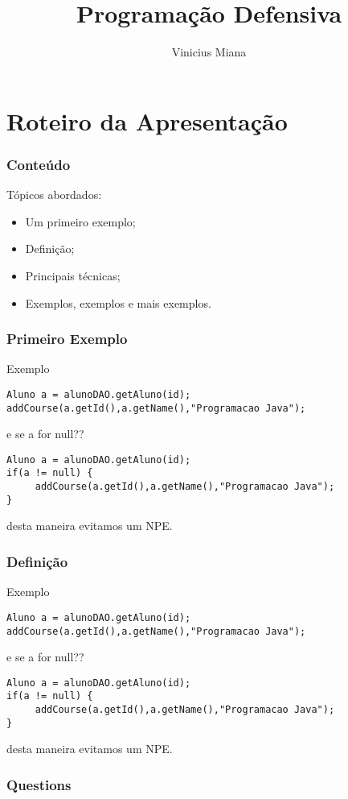 \documentclass[serif,mathserif]{beamer}
\author[Vinicius Miana]{Vinicius Miana}
\title[Short Title\hspace{2em}\insertframenumber/\inserttotalframenumber]{Programação Defensiva}
\institute{Universidade Presbiteriana Mackenzie}
\begin{document}
\maketitle

\section{Roteiro da Apresentação}  

\begin{frame}
  \frametitle{Conteúdo}
  Tópicos abordados:
  \begin{itemize}
  \item Um primeiro exemplo;
  \item Definição;
  \item Principais técnicas;
  \item Exemplos, exemplos e mais exemplos.
  \end{itemize}
\end{frame}


\begin{frame}[fragile]
  \frametitle{Primeiro Exemplo}
  Exemplo
\begin{lstlisting}
Aluno a = alunoDAO.getAluno(id);
addCourse(a.getId(),a.getName(),"Programacao Java");
\end{lstlisting}
e se a for null??
\begin{lstlisting}
Aluno a = alunoDAO.getAluno(id);
if(a != null) {
     addCourse(a.getId(),a.getName(),"Programacao Java");
}
\end{lstlisting}
desta maneira evitamos um NPE. 
\end{frame}

\begin{frame}[fragile]
  \frametitle{Definição}
  Exemplo
\begin{lstlisting}
Aluno a = alunoDAO.getAluno(id);
addCourse(a.getId(),a.getName(),"Programacao Java");
\end{lstlisting}
e se a for null??
\begin{lstlisting}
Aluno a = alunoDAO.getAluno(id);
if(a != null) {
     addCourse(a.getId(),a.getName(),"Programacao Java");
}
\end{lstlisting}
desta maneira evitamos um NPE. 
\end{frame}



\begin{frame}
  \frametitle{Questions}
\end{frame}
\end{document}
